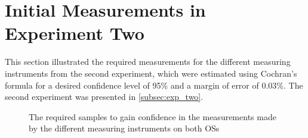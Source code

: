 \section{Initial Measurements in Experiment Two}\label{app:exp_two_coch}

This section illustrated the required measurements for the different measuring instruments from the second experiment, which were estimated using Cochran's formula for a desired confidence level of 95\% and a margin of error of 0.03\%. The second experiment was presented in \cref{subsec:exp_two}.

% 
% 

\begin{figure}[H]
    \centering
    \begin{subfigure}[b]{0.4\textwidth}
        \centering
        
    \end{subfigure}
    \hfill
    \begin{subfigure}[b]{0.4\textwidth}
        \centering
        
    \end{subfigure}
    \caption{The required samples to gain confidence in the measurements made by the different measuring instruments on both OSs}
\end{figure}